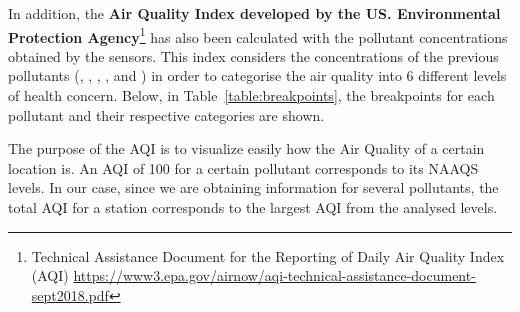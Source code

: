 \documentclass[12pt, oneside]{book}
\begin{document}

In addition, the \textbf{Air Quality Index developed by the US. Environmental Protection Agency}\footnote{Technical Assistance Document for the Reporting of Daily Air Quality Index (AQI) \url{https://www3.epa.gov/airnow/aqi-technical-assistance-document-sept2018.pdf}} has also been calculated with the pollutant concentrations obtained by the sensors. This index considers the concentrations of the previous pollutants (, , , ,  and ) in order to categorise the air quality into 6 different levels of health concern. Below, in Table~\ref{table:breakpoints}, the breakpoints for each pollutant and their respective categories are shown.

The purpose of the AQI is to visualize easily how the Air Quality of a certain location is. An AQI of 100 for a certain pollutant corresponds to its NAAQS levels. In our case, since we are obtaining information for several pollutants, the total AQI for a station corresponds to the largest AQI from the analysed levels. 
\end{document}
